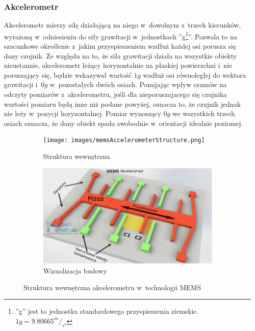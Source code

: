 																																											
\subsubsection*{Akcelerometr}
Akcelerometr mierzy siłę działającą na niego w~dowolnym z~trzech kierunków, wyrażoną w~odniesieniu do siły grawitacji w~jednostkach ''g\footnote{''g'' jest to jednostka standardowego przyspieszenia ziemskie. $1g =9.80665^m/_{s^2}$ }''. Pozwala to na szacunkowe określenie z~jakim przyspieszeniem wzdłuż każdej osi porusza się dany czujnik. Ze względu na to, że siła grawitacji działa na wszystkie obiekty nieustannie, akcelerometr leżący horyzontalnie na płaskiej powierzchni i~nie poruszający się, będzie wskazywał wartość $1g$ wzdłuż osi równoległej do wektora grawitacji i~$0g$ w~pozostałych dwóch osiach. Pomijając wpływ szumów na odczyty pomiarów z~akcelerometru, jeśli dla nieporuszajacego się czujnika wartości pomiaru będą inne niż podane powyżej, oznacza to, że czujnik jednak nie leży w~pozycji horyzontalnej. Pomiar wynoszący $0g$ we wszystkich trzech osiach oznacza, że dany obiekt spada swobodnie w~orientacji idealnie poziomej.
																																													
\begin{savenotes}
	\begin{figure}[!htb]
		\captionsetup{singlelinecheck=off}
		\begin{subfigure}[b]{0.45\textwidth}
			\texttt{[image: images/memsAccelerometerStructure.png]}	
			\caption[Struktura wewnętrzna akcelerometru]{Struktura wewnętrzna }
			\label{fig:characteristics:imu:acc:memsA}
		\end{subfigure}
		\hfill																																																						
		\begin{subfigure}[b]{0.45\textwidth}
			\includegraphics[width=\textwidth]{images/memsAccelerometerIdea.png}		
			\caption[Wizualizacja budowy akcelerometru]{Wizualizacja budowy }
			\label{fig:characteristics:imu:acc:memsB}
		\end{subfigure}				
		\caption{Struktura wewnętrzna akcelerometru w~technologii MEMS}
		\label{fig:characteristics:imu:acc:mems}
	\end{figure}
\end{savenotes}
																																											
